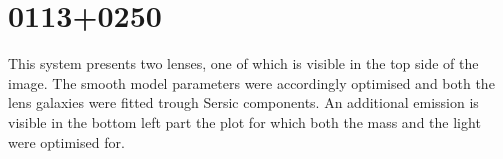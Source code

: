 \documentclass[a4paper,fleqn,usenatbib]{mnras}
\begin{document}
\begin{table}
\end{table}


\section{0113+0250}
This system presents two lenses, one of which is visible in the top side of the image. The smooth model parameters were accordingly optimised and both the lens galaxies were fitted trough Sersic components. An additional emission is visible in the bottom left part the plot for which both the mass and the light were optimised for.

\end{document}
